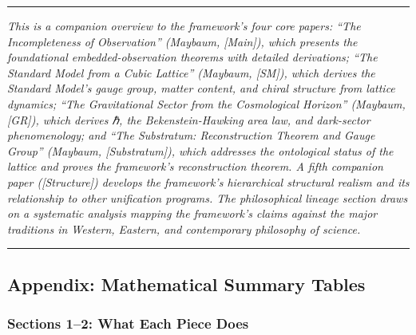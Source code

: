 \documentclass[
]{article}
\begin{document}
\begin{center}\rule{0.5\linewidth}{0.5pt}\end{center}

\emph{This is a companion overview to the framework's four core papers:
``The Incompleteness of Observation'' (Maybaum, {[}Main{]}), which
presents the foundational embedded-observation theorems with detailed
derivations; ``The Standard Model from a Cubic Lattice'' (Maybaum,
{[}SM{]}), which derives the Standard Model's gauge group, matter
content, and chiral structure from lattice dynamics; ``The Gravitational
Sector from the Cosmological Horizon'' (Maybaum, {[}GR{]}), which
derives ℏ, the Bekenstein-Hawking area law, and dark-sector
phenomenology; and ``The Substratum: Reconstruction Theorem and Gauge
Group'' (Maybaum, {[}Substratum{]}), which addresses the ontological
status of the lattice and proves the framework's reconstruction theorem.
A fifth companion paper ({[}Structure{]}) develops the framework's
hierarchical structural realism and its relationship to other
unification programs. The philosophical lineage section draws on a
systematic analysis mapping the framework's claims against the major
traditions in Western, Eastern, and contemporary philosophy of science.}

\begin{center}\rule{0.5\linewidth}{0.5pt}\end{center}

\hypertarget{appendix-mathematical-summary-tables}{%
\subsection{Appendix: Mathematical Summary
Tables}\label{appendix-mathematical-summary-tables}}

\hypertarget{sections-12-what-each-piece-does}{%
\subsubsection{Sections 1--2: What Each Piece
Does}\label{sections-12-what-each-piece-does}}
\end{document}
